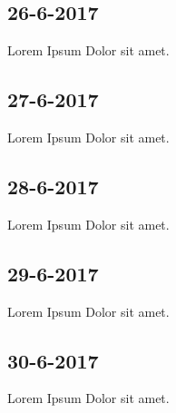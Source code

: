 \documentclass{uva-inf-article}
\begin{document}
\subsection{26-6-2017}
Lorem Ipsum Dolor sit amet.
\subsection{27-6-2017}
Lorem Ipsum Dolor sit amet.
\subsection{28-6-2017}
Lorem Ipsum Dolor sit amet.
\subsection{29-6-2017}
Lorem Ipsum Dolor sit amet.
\subsection{30-6-2017}
Lorem Ipsum Dolor sit amet.
\end{document}
